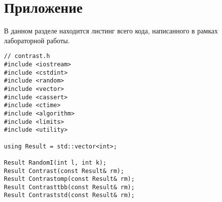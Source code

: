 \documentclass{report}
\begin{document}
\section*{Приложение}
В данном разделе находится листинг всего кода, написанного в рамках лабораторной работы.
\begin{lstlisting}
// contrast.h
#include <iostream>
#include <cstdint>
#include <random>
#include <vector>
#include <cassert>
#include <ctime>
#include <algorithm>
#include <limits>
#include <utility>

using Result = std::vector<int>;

Result RandomI(int l, int k);
Result Contrast(const Result& rm);
Result Contrastomp(const Result& rm);
Result Contrasttbb(const Result& rm);
Result Contraststd(const Result& rm);
\end{lstlisting}
\end{document}
